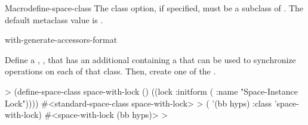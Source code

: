 \documentclass[10pt,twoside,english,pdftex]{article}
\begin{document}
\begin{functiondoc}{Macro}{define-space-class}
%
The   class option, if specified, must be a
subclass of .  The default
metaclass value is .

\classoptioninheritance

\begin{alsos}{with-generate-accessors-format}
\end{alsos}

\fnexample 
{}%
Define a ,
, that has an additional 
containing a  that can be used to synchronize
operations on each  of that class. Then, create
one  of the 
.
%
\W\supp
\begin{example}
  > (define-space-class space-with-lock ()
      ((lock :initform ( :name "Space-Instance Lock"))))
  #<standard-space-class space-with-lock>
  > ( '(bb hyps) 
      :class 'space-with-lock)
  #<space-with-lock (bb hyps)>
  >
\end{example}

\end{functiondoc}

\end{document}
